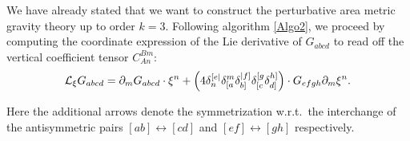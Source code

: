 We have already stated that we want to construct the perturbative area metric gravity theory up to order $k=3$. Following algorithm \ref{Algo2}, we proceed by computing the coordinate expression of the Lie derivative of $G_{abcd}$ to read off the vertical coefficient tensor $C_{An}^{Bm}$:
\begin{align}\label{LieArea}
    \mathcal{L}_{\xi} G_{abcd} = \partial_m G_{abcd} \cdot \xi^n + \left (4 \delta_n^{[e\vert} \delta_{[\mathnode{a}}^m \delta_{b]}^{\vert \mathnode{f} ]} \delta_{[c}^{[g} \delta_{\mathnode{d}]}^{\mathnode{h}]} \right ) \cdot G_{efgh} \partial_m \xi^n.
\end{align}

Here the additional arrows denote the symmetrization w.r.t.\ the interchange of the antisymmetric pairs $[ab] \leftrightarrow [cd]$ and $[ef] \leftrightarrow [gh]$ respectively.

